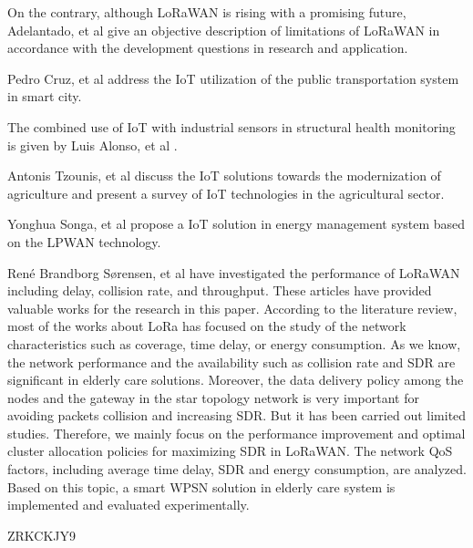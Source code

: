 On the contrary,
	although LoRaWAN is rising with a promising future,
	Adelantado,
	et al\cite{adelantado_understanding_2017} give an objective description of limitations of LoRaWAN in accordance with the development questions in research and application.

Pedro Cruz,
	et al \cite{cruz_algorithm_2019} address the IoT utilization of the public transportation system in smart city.

The combined use of IoT with industrial sensors in structural health monitoring is given by Luis Alonso,
	et al \cite{alonso_middleware_2018}.


Antonis Tzounis,
	et al \cite{song_internet_2017}\cite{tzounis_internet_2017} discuss the IoT solutions towards the modernization of agriculture and present a survey of IoT technologies in the agricultural sector.

Yonghua Songa,
	et al \cite{song_internet_2017} propose a IoT solution in energy management system based on the LPWAN technology.

René Brandborg Sørensen,
	et al \cite{sorensen_analysis_2017} have investigated the performance of LoRaWAN including delay,
	collision rate,
	and throughput.
These articles have provided valuable works for the research in this paper.
According to the literature review,
	most of the works about LoRa has focused on the study of the network characteristics such as coverage,
	time delay,
	or energy consumption.
As we know,
	the network performance and the availability such as collision rate and SDR are significant in elderly care solutions.
Moreover,
	the data delivery policy among the nodes and the gateway in the star topology network is very important for avoiding packets collision and increasing SDR.
But it has been carried out limited studies.
Therefore,
	we mainly focus on the performance improvement and optimal cluster allocation policies for maximizing SDR in LoRaWAN.
The network QoS factors,
	including average time delay,
	SDR and energy consumption,
	are analyzed.
Based on this topic,
	a smart WPSN solution in elderly care system is implemented and evaluated experimentally.

\cite{zhou_novel_2019} ZRKCKJY9

